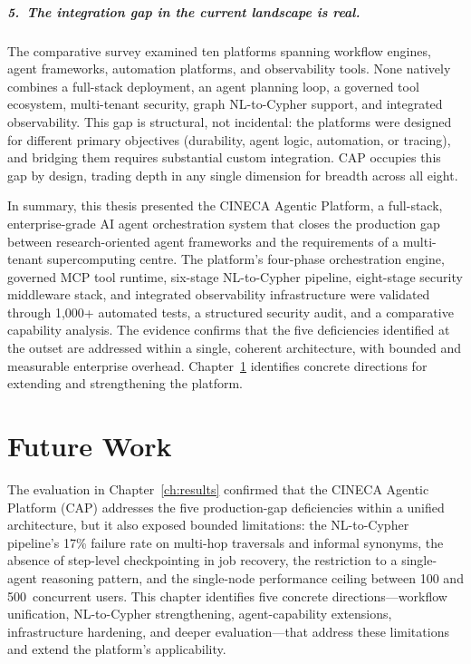 \documentclass[a4paper,noexaminfo]{sapthesis}
\newcommand{\TestCount}{1,000+}
\begin{document}
\paragraph{5.\ The integration gap in the current landscape is real.}
The comparative survey examined ten platforms spanning workflow engines,
agent frameworks, automation platforms, and observability tools.  None
natively combines a full-stack deployment, an agent planning loop, a
governed tool ecosystem, multi-tenant security, graph NL-to-Cypher
support, and integrated observability.  This gap is structural, not
incidental: the platforms were designed for different primary objectives
(durability, agent logic, automation, or tracing), and bridging them
requires substantial custom integration.  CAP occupies this gap by
design, trading depth in any single dimension for breadth across all
eight.

\bigskip
\noindent
In summary, this thesis presented the CINECA Agentic Platform, a
full-stack, enterprise-grade AI agent orchestration system that closes the
production gap between research-oriented agent frameworks and the
requirements of a multi-tenant supercomputing centre.  The platform's
four-phase orchestration engine, governed MCP tool runtime, six-stage
NL-to-Cypher pipeline, eight-stage security middleware stack, and
integrated observability infrastructure were validated through
\TestCount{} automated tests, a structured security audit, and a comparative
capability analysis.  The evidence confirms that the five deficiencies
identified at the outset are addressed within a single, coherent
architecture, with bounded and measurable enterprise overhead.
Chapter~\ref{ch:future-work} identifies concrete directions for extending
and strengthening the platform.


\chapter{Future Work}
\label{ch:future-work}

The evaluation in Chapter~\ref{ch:results} confirmed that the CINECA
Agentic Platform (CAP) addresses the five production-gap deficiencies
within a unified architecture, but it also exposed bounded limitations:
the NL-to-Cypher pipeline's 17\% failure rate on multi-hop traversals and
informal synonyms, the absence of step-level checkpointing in job
recovery, the restriction to a single-agent reasoning pattern, and the
single-node performance ceiling between 100 and 500~concurrent users.
This chapter identifies five concrete directions---workflow unification,
NL-to-Cypher strengthening, agent-capability extensions, infrastructure
hardening, and deeper evaluation---that address these limitations and
extend the platform's applicability.
\end{document}
